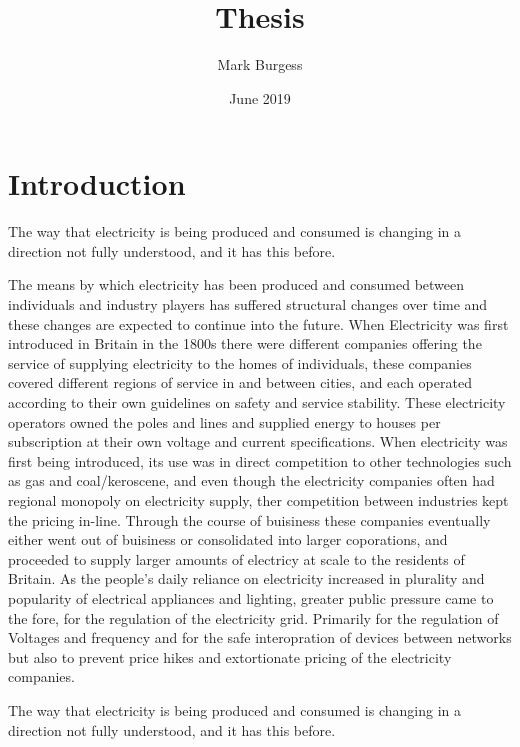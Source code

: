 \documentclass{article}
\title{Thesis}
\author{Mark Burgess}
\date{June 2019}
\begin{document}
\maketitle

\section{Introduction}



The way that electricity is being produced and consumed is changing in a direction not fully understood, and it has this before.

The means by which electricity has been produced and consumed between individuals and industry players has suffered structural changes over time and these changes are expected to continue into the future.
When Electricity was first introduced in Britain in the 1800s there were different companies offering the service of supplying electricity to the homes of individuals, these companies covered different regions of service in and between cities, and each operated according to their own guidelines on safety and service stability.
These electricity operators owned the poles and lines and supplied energy to houses per subscription at their own voltage and current specifications.
When electricity was first being introduced, its use was in direct competition to other technologies such as gas and coal/keroscene, and even though the electricity companies often had regional monopoly on electricity supply, ther competition between industries kept the pricing in-line.
Through the course of buisiness these companies eventually either went out of buisiness or consolidated into larger coporations, and proceeded to supply larger amounts of electricy at scale to the residents of Britain.
As the people's daily reliance on electricity increased in plurality and popularity of electrical appliances and lighting, greater public pressure came to the fore, for the regulation of the electricity grid.
Primarily for the regulation of Voltages and frequency and for the safe interopration of devices between networks but also to prevent price hikes and extortionate pricing of the electricity companies.



The way that electricity is being produced and consumed is changing in a direction not fully understood, and it has this before.
\end{document}
